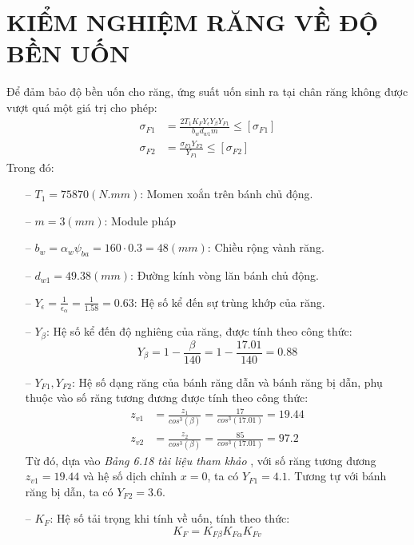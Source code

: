         \section{KIỂM NGHIỆM RĂNG VỀ ĐỘ BỀN UỐN}
            \hspace*{0.6cm}Để đảm bảo độ bền uốn cho răng, ứng suất uốn sinh ra tại chân răng không được vượt quá một giá trị cho phép:
            \begin{align*}
                \sigma_{F1} & = \frac{2T_1K_FY_{\epsilon}Y_{\beta}Y_{F1}}{b_wd_{w1}m} \leq [\sigma_{F1}] \\
                \sigma_{F2} & = \frac{\sigma_{F1}Y_{F2}}{Y_{F1}} \leq [\sigma_{F2}]
            \end{align*}
        Trong đó:
        \begin{itemize}
            \item[--] $T_1 = 75870 (N.mm)$: Momen xoắn trên bánh chủ động.
            \item[--] $m = 3 (mm)$: Module pháp
            \item[--] $b_w = \alpha_w\psi_{ba} = 160 \cdot 0.3 = 48 (mm)$: Chiều rộng vành răng.
            \item[--] $d_{w1} = 49.38 (mm)$: Đường kính vòng lăn bánh chủ động.
            \item[--] $Y_{\epsilon} = \frac{1}{\epsilon_\alpha} = \frac{1}{1.58} = 0.63$: Hệ số kể đến sự trùng khớp của răng.
            \item[--] $Y_\beta$: Hệ số kể đến độ nghiêng của răng, được tính theo công thức:
            $$Y_\beta = 1 - \frac{\beta}{140} = 1 - \frac{17.01}{140} = 0.88$$
            \item[--] $Y_{F1}, Y_{F2}$: Hệ số dạng răng của bánh răng dẫn và bánh răng bị dẫn, phụ thuộc vào số răng tương đương được tính theo công thức:
            \begin{align*}
                z_{v1} & = \frac{z_1}{cos^3(\beta)} = \frac{17}{cos^3(17.01)} = 19.44\\
                z_{v2} & = \frac{z_2}{cos^3(\beta)} = \frac{85}{cos^3(17.01)} = 97.2
            \end{align*}
            Từ đó, dựa vào \textit{Bảng 6.18 tài liệu tham khảo} \cite{tltk1}, với số răng tương đương $z_{v1} = 19.44$ và hệ số dịch chỉnh $x = 0$, ta có $Y_{F1} = 4.1$. Tương tự với bánh răng bị dẫn, ta có $Y_{F2} = 3.6$.
            \item[--] $K_F$: Hệ số tải trọng khi tính về uốn, tính theo thức:
            $$K_F = K_{F\beta}K_{F\alpha}K_{Fv}$$

\end{itemize}
